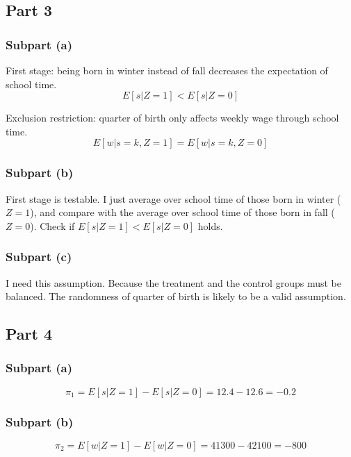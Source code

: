 \documentclass{article}
\begin{document}
\subsection{Part 3}
\subsubsection{Subpart (a)}
First stage: being born in winter instead of fall decreases the expectation of school time.
\begin{equation*}
E[s|Z=1]<E[s|Z=0]
\end{equation*}

Exclusion restriction: quarter of birth only affects weekly wage through school time.
\begin{equation*}
E[w|s=k,Z=1]=E[w|s=k,Z=0]
\end{equation*}

\subsubsection{Subpart (b)}
First stage is testable. I just average over school time of those born in winter ($Z=1$), and compare with the average over school time of those born in fall ($Z=0$). Check if $E[s|Z=1]<E[s|Z=0]$ holds.

\subsubsection{Subpart (c)}
I need this assumption. Because the treatment and the control groups must be balanced. The randomness of quarter of birth is likely to be a valid assumption.

\subsection{Part 4}
\subsubsection{Subpart (a)}
\begin{equation*}
\pi_1=E[s|Z=1]-E[s|Z=0]=12.4-12.6=-0.2
\end{equation*}

\subsubsection{Subpart (b)}
\begin{equation*}
\pi_2=E[w|Z=1]-E[w|Z=0]=41300-42100=-800
\end{equation*}
\end{document}
